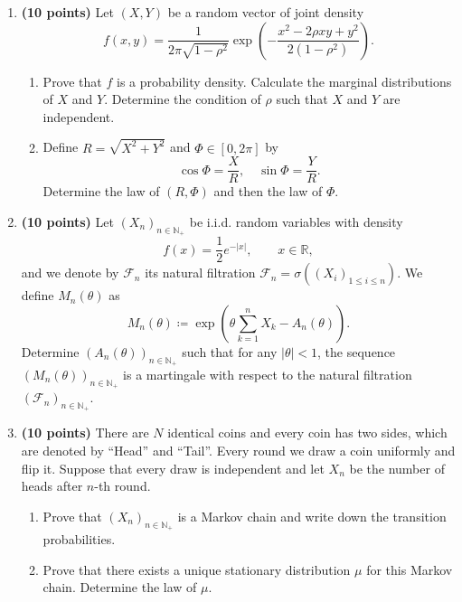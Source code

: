 \documentclass[11pt,a4paper]{article}
\begin{document}
\begin{enumerate}[label=\textbf{\arabic*.}]
    \item \textbf{(10 points)} Let $(X, Y)$ be a random vector of joint density
    \[
    f(x, y) = \frac{1}{2\pi \sqrt{1 - \rho^2}} \exp \left( -\frac{x^2 - 2\rho xy + y^2}{2(1 - \rho^2)} \right).
    \]
    \begin{enumerate}[label=(\alph*)]
        \item Prove that $f$ is a probability density. Calculate the marginal distributions of $X$ and $Y$. Determine the condition of $\rho$ such that $X$ and $Y$ are independent.
        \item Define $R = \sqrt{X^2 + Y^2}$ and $\Phi \in [0, 2\pi]$ by
        \[
        \cos \Phi = \frac{X}{R}, \quad \sin \Phi = \frac{Y}{R}.
        \]
        Determine the law of $(R, \Phi)$ and then the law of $\Phi$.
    \end{enumerate}

    \item \textbf{(10 points)} Let $(X_n)_{n \in \mathbb{N}_+}$ be i.i.d. random variables with density
    \[
    f(x) = \frac{1}{2} e^{-|x|}, \qquad x \in \mathbb{R},
    \]
    and we denote by $\mathcal{F}_n$ its natural filtration $\mathcal{F}_n = \sigma((X_i)_{1 \le i \le n})$. We define $M_n(\theta)$ as
    \[
    M_n(\theta) \coloneqq \exp \left( \theta \sum_{k=1}^n X_k - A_n(\theta) \right).
    \]
    Determine $(A_n(\theta))_{n \in \mathbb{N}_+}$ such that for any $|\theta| < 1$, the sequence $(M_n(\theta))_{n \in \mathbb{N}_+}$ is a martingale with respect to the natural filtration $(\mathcal{F}_n)_{n \in \mathbb{N}_+}$.

    \item \textbf{(10 points)} There are $N$ identical coins and every coin has two sides, which are denoted by ``Head'' and ``Tail''. Every round we draw a coin uniformly and flip it. Suppose that every draw is independent and let $X_n$ be the number of heads after $n$-th round.
    \begin{enumerate}[label=(\alph*)]
        \item Prove that $(X_n)_{n \in \mathbb{N}_+}$ is a Markov chain and write down the transition probabilities.
        \item Prove that there exists a unique stationary distribution $\mu$ for this Markov chain. Determine the law of $\mu$.
    \end{enumerate}


\end{enumerate}
\end{document}
